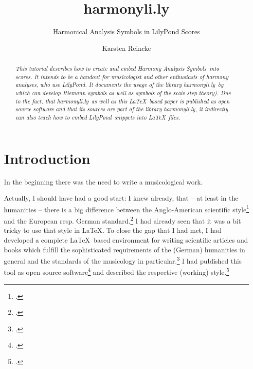 \documentclass[
  DIV=calc,
  BCOR=5mm,
  12pt,
  headings=small,
  oneside,
  abstract=true,
  toc=bib,
  xcolor=dvipsnames,
  openany,
  ngerman,english]{scrartcl}
\newcommand{\acc}[0]{\textit}
\newcommand{\hlyn}[0]{\textit{harmonyli.ly}}
\newcommand{\lily}[0]{\textit{LilyPond}}
\newcommand{\has}[1]{\textit{Harmony Analysis Symbol#1}}
\begin{document}
\nocite{*}

\titlehead{Tutorial}
\subject{Release }
\title{harmonyli.ly}
\subtitle{Harmonical Analysis Symbols in LilyPond Scores}
\author{Karsten Reincke}


\maketitle

\begin{abstract}
\noindent \itshape
This tutorial describes how to create and embed \has{s}\ into scores. It
intends to be a handout for musicologist and other enthusiasts of harmony
analyses, who use \lily. It documents the usage of the library \hlyn\ by which
can develop \acc{Riemann} symbols as well as symbols of the
\acc{scale-step-theory}). Due to the fact, that \hlyn\ as well as this \LaTeX\ 
based paper is published as open source software and that its sources are part
of the library \hlyn, it indirectly can also teach how to embed \lily\ snippets
into \LaTeX\ files.
\end{abstract}


\footnotesize
\tableofcontents

\normalsize

\section{Introduction}

In the beginning there was the need to write a musicological work.

Actually, I should have had a good start: I knew already, that -- at least in
the humanities -- there is a big difference between the Anglo-American
scientific style\footcite[cf.][619ff]{ChMaStyle2010a} and the European resp.
German standard.\footcite[cf.][147ff]{Theisen2013a} I had already seen that it
was a bit tricky to use that style in \LaTeX. To close the gap that I had met, I
had developed a complete \LaTeX\ based environment for writing scientific
articles and books which fulfill the sophisticated requirements of the (German)
humanities in general and the standards of the musicology in
particular.\footcite[cf.][\nopage wp]{reincke2018a} I had published this tool as
open source software\footcite[cf.][\nopage wp]{reincke2018c} and described the
respective (working) style.\footcite[cf.][\nopage]{reincke2018b}
\end{document}
